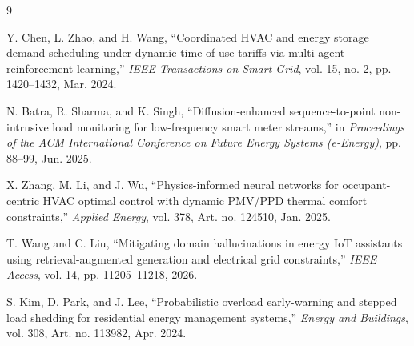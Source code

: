 \documentclass[conference]{IEEEtran}
\begin{document}
\begin{thebibliography}{9}

Y. Chen, L. Zhao, and H. Wang, ``Coordinated HVAC and energy storage demand scheduling under dynamic time-of-use tariffs via multi-agent reinforcement learning,'' \emph{IEEE Transactions on Smart Grid}, vol. 15, no. 2, pp. 1420--1432, Mar. 2024.

N. Batra, R. Sharma, and K. Singh, ``Diffusion-enhanced sequence-to-point non-intrusive load monitoring for low-frequency smart meter streams,'' in \emph{Proceedings of the ACM International Conference on Future Energy Systems (e-Energy)}, pp. 88--99, Jun. 2025.

X. Zhang, M. Li, and J. Wu, ``Physics-informed neural networks for occupant-centric HVAC optimal control with dynamic PMV/PPD thermal comfort constraints,'' \emph{Applied Energy}, vol. 378, Art. no. 124510, Jan. 2025.

T. Wang and C. Liu, ``Mitigating domain hallucinations in energy IoT assistants using retrieval-augmented generation and electrical grid constraints,'' \emph{IEEE Access}, vol. 14, pp. 11205--11218, 2026.

S. Kim, D. Park, and J. Lee, ``Probabilistic overload early-warning and stepped load shedding for residential energy management systems,'' \emph{Energy and Buildings}, vol. 308, Art. no. 113982, Apr. 2024.

\end{thebibliography}
\end{document}

